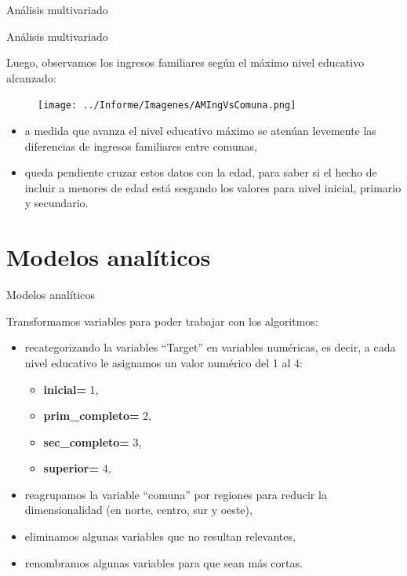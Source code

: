 \documentclass[pdf]{beamer}
\def\vspace{}%
\begin{document}
{\begin{frame}{Análisis multivariado}
\end{frame}

\begin{frame}{Análisis multivariado}

    Luego, observamos los ingresos familiares según el máximo nivel educativo alcanzado:

    \begin{minipage}{0.55\textwidth}
        \begin{figure} 
        \texttt{[image: ../Informe/Imagenes/AMIngVsComuna.png]}
        \end{figure}
    \end{minipage}
    \begin{minipage}{0.38\textwidth}
        \begin{itemize}
            \justifying%
            \item a medida que avanza el nivel educativo máximo se atenúan levemente las diferencias de ingresos familiares entre comunas,
            \item queda pendiente cruzar estos datos con la edad, para saber si el hecho de incluir a menores de edad está sesgando los valores para nivel inicial, primario y secundario.
        \end{itemize}
    \end{minipage}

\end{frame}

\section{Modelos analíticos}

\begin{frame}{Modelos analíticos}

    Transformamos variables para poder trabajar con los algoritmos:
    \begin{itemize}
        \item recategorizando la variables ``Target'' en variables numéricas, es decir, a cada nivel educativo le asignamos un valor numérico del 1 al 4:
        \begin{itemize}
            \item \textbf{inicial=} 1,
            \item \textbf{prim\_completo=} 2,
            \item \textbf{sec\_completo=} 3,
            \item \textbf{superior=} 4,
        \end{itemize}
        \item reagrupamos la variable ``comuna'' por regiones para reducir la dimensionalidad (en norte, centro, sur y oeste),
        \item eliminamos algunas variables que no resultan relevantes, 
        \item renombramos algunas variables para que sean más cortas.
    \end{itemize}
    

\end{frame}}
\end{document}
